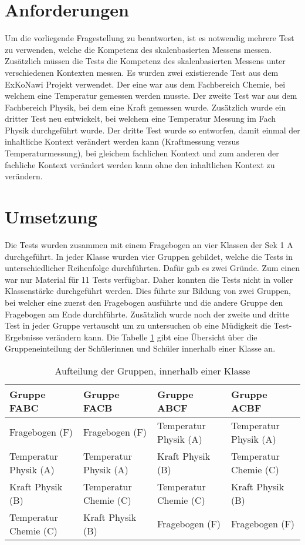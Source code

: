 
\section{Anforderungen}

Um die vorliegende Fragestellung zu beantworten, ist es notwendig mehrere Test zu verwenden, welche die Kompetenz des skalenbasierten Messens messen. Zusätzlich müssen die Tests die Kompetenz des skalenbasierten Messens unter verschiedenen Kontexten messen. Es wurden zwei existierende Test aus dem ExKoNawi Projekt verwendet. Der eine war aus dem Fachbereich Chemie, bei welchem eine Temperatur gemessen werden musste. Der zweite Test war aus dem Fachbereich Physik, bei dem eine Kraft gemessen wurde. Zusätzlich wurde ein dritter Test neu entwickelt, bei welchem eine Temperatur Messung im Fach Physik durchgeführt wurde. Der dritte Test wurde so entworfen, damit einmal der inhaltliche Kontext verändert werden kann (Kraftmessung versus Temperaturmessung), bei gleichem fachlichen Kontext und zum anderen der fachliche Kontext verändert werden kann ohne den inhaltlichen Kontext zu verändern. 


\section{Umsetzung}

Die Tests wurden zusammen mit einem Fragebogen an vier Klassen der Sek 1 A durchgeführt. In jeder Klasse wurden vier Gruppen gebildet, welche die Tests in unterschiedlicher Reihenfolge durchführten. Dafür gab es zwei Gründe. Zum einen war nur Material für 11 Tests verfügbar. Daher konnten die Tests nicht in voller Klassenstärke durchgeführt werden. Dies führte zur Bildung von zwei Gruppen, bei welcher eine zuerst den Fragebogen ausführte und die andere Gruppe den Fragebogen am Ende durchführte. Zusätzlich wurde noch der zweite und dritte Test in jeder Gruppe vertauscht um zu untersuchen ob eine Müdigkeit die Test-Ergebnisse verändern kann. Die Tabelle \ref{tab:Gruppenaufteilung} gibt eine Übersicht über die Gruppeneinteilung der Schülerinnen und Schüler innerhalb einer Klasse an.
\begin{table}[htbp]
  \centering
  \begin{tabular}{|p{3.1cm}|p{3.1cm}|p{3.1cm}|p{3.1cm}|}
  \hline Gruppe FABC & Gruppe FACB & Gruppe ABCF & Gruppe ACBF \\ 
  \hline Fragebogen (F) & Fragebogen (F) & Temperatur Physik (A) & Temperatur Physik (A) \\ 
  \hline Temperatur Physik (A) & Temperatur Physik (A) & Kraft Physik (B) & Temperatur Chemie (C) \\ 
  \hline Kraft Physik (B) & Temperatur Chemie (C) & Temperatur Chemie (C) & Kraft Physik (B) \\ 
  \hline Temperatur Chemie (C) & Kraft Physik (B) & Fragebogen (F) & Fragebogen (F) \\ 
  \hline 
  \end{tabular} 
  \caption{Aufteilung der Gruppen, innerhalb einer Klasse}
  \label{tab:Gruppenaufteilung}
\end{table}

